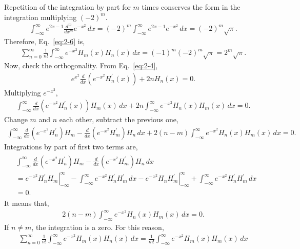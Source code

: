 \documentclass[floatfix,nofootinbib,superscriptaddress,fleqn]{revtex4-2}
\begin{document}
\begin{itemize}
Repetition of the integration by part for $m$ times conserves the 
form in the integration multiplying $(-2)^m$. 
\begin{align*}
  \int_{-\infty}^{\infty}e^{2x-1}\frac{d^m}{dx^m}e^{-x^2}\,dx  
  =(-2)^m\int_{-\infty}^{\infty}e^{2x-1}e^{-x^2}\,dx=(-2)^m\sqrt{\pi}. 
\end{align*}
Therefore, Eq.~\eqref{eq:2-6} is,
\begin{align*}
  \sum_{n=0}^\infty\frac{1}{n!}\int_{-\infty}^{\infty}e^{-x^2}H_m(x)H_n(x)\,dx
  =(-1)^m(-2)^m\sqrt{\pi}=2^m\sqrt{\pi}.
\end{align*}
Now, check the orthogonality. From Eq.~\eqref{eq:2-4},
\begin{align*}
  e^{x^2}\frac{d}{dx}\left(e^{-x^2}H^\prime_n(x)\right)+2nH_n(x)=0.
\end{align*}
Multiplying $e^{-x^2}$,
\begin{align*}
  \int_{-\infty}^\infty\frac{d}{dx}\left(e^{-x^2}H^\prime_n(x)\right)H_m(x)\,dx
  +2n\int_{-\infty}^\infty e^{-x^2}H_n(x)H_m(x)\,dx=0.
\end{align*}
Change $m$ and $n$ each other, subtract the previous one,
\begin{align*}
  \int_{-\infty}^\infty\frac{d}{dx}\left(e^{-x^2}H^\prime_n\right)H_m
  -\frac{d}{dx}\left(e^{-x^2}H^\prime_m\right)H_n\,dx
  +2(n-m)\int_{-\infty}^\infty e^{-x^2}H_n(x)H_m(x)\,dx=0.
\end{align*}
Integrations by part of first two terms are, 
\begin{align*}
  \begin{split}
    &\int_{-\infty}^\infty\frac{d}{dx}\left(e^{-x^2}H^\prime_n\right)H_m
    -\frac{d}{dx}\left(e^{-x^2}H^\prime_m\right)H_n\,dx \\
    &=\left.e^{-x^2}H^\prime_nH_m\right|_{-\infty}^\infty
    -\int_{-\infty}^\infty e^{-x^2}H^\prime_nH^\prime_m\,dx
    -\left.e^{-x^2}H_nH^\prime_m\right|_{-\infty}^\infty
    +\int_{-\infty}^\infty e^{-x^2}H^\prime_nH^\prime_m\,dx \\
    &=0.
  \end{split}
\end{align*}
It means that,
\begin{align*}
  2(n-m)\int_{-\infty}^\infty e^{-x^2}H_n(x)H_m(x)\,dx=0.
\end{align*}
If $n\neq m$, the integration is a zero. For this reason,
\begin{align*}
  \sum_{n=0}^\infty\frac{1}{n!}\int_{-\infty}^{\infty}e^{-x^2}H_m(x)H_n(x)\,dx
  =\frac{1}{m!}\int_{-\infty}^{\infty}e^{-x^2}H_m(x)H_m(x)\,dx

\end{align*}
\end{itemize}
\end{document}
